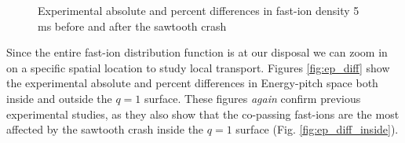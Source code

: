 \begin{figure}[h!]
    \centering
    \caption{Experimental absolute and percent differences in fast-ion density 5 ms before and after the sawtooth crash}
\end{figure}
Since the entire fast-ion distribution function is at our disposal we can zoom in on a specific spatial location to study local transport. Figures \ref{fig:ep_diff} show the experimental absolute and percent differences in Energy-pitch space both inside and outside the $q=1$ surface. These figures \emph{again} confirm previous experimental studies, as they also show that the co-passing fast-ions are the most affected by the sawtooth crash inside the $q=1$ surface (Fig. \ref{fig:ep_diff_inside}).  
